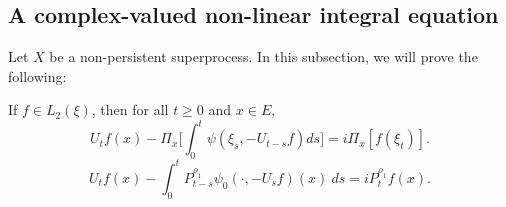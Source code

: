 \documentclass[EJP]{ejpecp} %
\begin{document}
\subsection{A complex-valued non-linear integral equation}
	Let $X$ be a non-persistent superprocess.
	In this subsection, we will prove the following:

\begin{proposition}
\label{prop: complex FKPP-equation}
  	If $f\in L_2(\xi)$,  then for all $t\geq 0$ and $x\in E$,
\begin{equation}
\label{eq: complex FKPP-equation}
  	U_tf(x) - \Pi_x \Big[\int_0^t \psi (\xi_s, - U_{t-s}f ) ds \Big]
  	= i \Pi_x [f(\xi_t)].
\end{equation}
\begin{equation}
\label{eq: complex FKPP-equation with FK-transform}
  	U_tf(x) -  \int_0^t P_{t-s}^{\rho_1} \psi_0(\cdot,-U_sf) (x)~ds
  	= iP_t^{\rho_1} f(x).
\end{equation}
\end{proposition}
\end{document}
